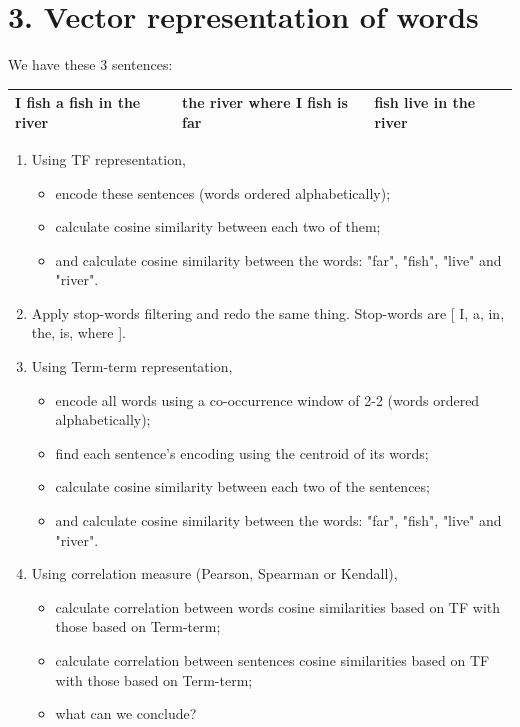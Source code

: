 \documentclass{../extra/aakpract/aakpract}
\begin{document}
\section*{3. Vector representation of words}

We have these 3 sentences: 

\begin{center}
	\begin{tabular}{|lll|}
	\hline 
	I fish a fish in the river & the river where I fish is far & fish live in the river\\
	\hline
\end{tabular}
\end{center}

\begin{enumerate}
	\item Using TF representation, 
	\begin{itemize}
		\item encode these sentences (words ordered alphabetically);
		\item calculate cosine similarity between each two of them;
		\item and calculate cosine similarity between the words: "far", "fish", "live" and "river".
	\end{itemize}

	\item Apply stop-words filtering and redo the same thing. Stop-words are [ I, a, in, the, is, where ].
	
	\item Using Term-term representation, 
	\begin{itemize}
		\item encode all words using a co-occurrence window of 2-2 (words ordered alphabetically);
		\item find each sentence's encoding using the centroid of its words;
		\item calculate cosine similarity between each two of the sentences;
		\item and calculate cosine similarity between the words: "far", "fish", "live" and "river".
	\end{itemize}

	\item Using correlation measure (Pearson, Spearman or Kendall), 
	\begin{itemize}
		\item calculate correlation between words cosine similarities based on TF with those based on Term-term;
		\item calculate correlation between sentences cosine similarities based on TF with those based on Term-term;
		\item what can we conclude?
	\end{itemize}
	
\end{enumerate}
\end{document}
